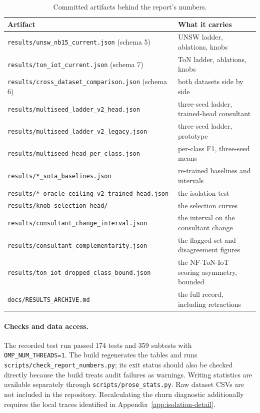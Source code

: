 \begin{table}[htbp]
\centering
\caption[Committed artifacts behind the report's numbers]{Committed artifacts behind the report's numbers.}
\label{tab:artifacts}
\footnotesize
\begin{tabular}{@{}p{}p{}@{}}
\toprule
Artifact & What it carries \\
\midrule
\texttt{results/unsw\_nb15\_current.json} (schema 5) & UNSW ladder, ablations, knobs \\
\texttt{results/ton\_iot\_current.json} (schema 7) & ToN ladder, ablations, knobs \\
\texttt{results/cross\_dataset\_comparison.json} (schema 6) & both datasets side by side \\
\texttt{results/multiseed\_ladder\_v2\_head.json} & three-seed ladder, trained-head consultant \\
\texttt{results/multiseed\_ladder\_v2\_legacy.json} & three-seed ladder, prototype \\
\texttt{results/multiseed\_head\_per\_class.json} & per-class F1, three-seed means \\
\texttt{results/*\_sota\_baselines.json} & re-trained baselines and intervals \\
\texttt{results/*\_oracle\_ceiling\_v2\_trained\_head.json} & the isolation test \\
\texttt{results/knob\_selection\_head/} & the selection curves \\
\texttt{results/consultant\_change\_interval.json} & the interval on the consultant change \\
\texttt{results/consultant\_complementarity.json} & the flagged-set and disagreement figures \\
\texttt{results/ton\_iot\_dropped\_class\_bound.json} & the NF-ToN-IoT scoring asymmetry, bounded \\
\texttt{docs/RESULTS\_ARCHIVE.md} & the full record, including retractions \\
\bottomrule
\end{tabular}
\end{table}

\paragraph{Checks and data access.} The recorded test run passed 174 tests and 359 subtests with \texttt{OMP\_NUM\_THREADS=1}. The build regenerates the tables and runs \texttt{scripts/check\_report\_numbers.py}; its exit status should also be checked directly because the build treats audit failures as warnings. Writing statistics are available separately through \texttt{scripts/prose\_stats.py}. Raw dataset CSVs are not included in the repository. Recalculating the churn diagnostic additionally requires the local traces identified in Appendix~\ref{app:isolation-detail}.
